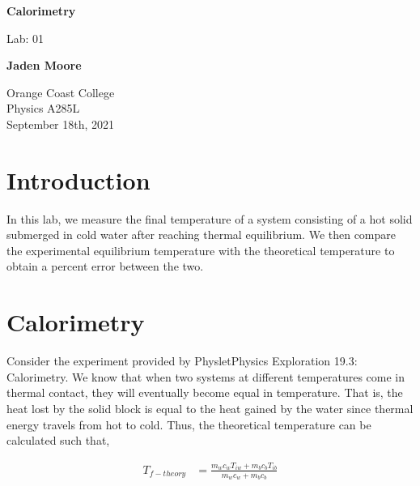 \documentclass[12pt]{article}
\begin{document}

\begin{titlepage}
    \begin{center}
        \vspace*{1cm}
        \textbf{Calorimetry}

        \vspace{0.5cm}
        Lab: 01

        \vspace{1cm}

        \textbf{Jaden Moore}

        \vfill

        Orange Coast College\\
        Physics A285L\\
        September 18th, 2021

    \end{center}
\end{titlepage}

\pagestyle{fancy}
\fancyhf{}
\setlength{\headheight}{15pt}
\cfoot{\thepage}

\section{Introduction}
In this lab, we measure the final temperature of a system consisting of a hot solid submerged in cold water after reaching thermal equilibrium. We then compare the experimental equilibrium temperature with the theoretical temperature to obtain a percent error between the two.

\section{Calorimetry}
Consider the experiment provided by Physlet\textregistered \space Physics Exploration 19.3: Calorimetry. We know that when two systems at different temperatures come in thermal contact, they will eventually become equal in temperature. That is, the heat lost by the solid block is equal to the heat gained by the water since thermal energy travels from hot to cold. Thus, the theoretical temperature can be calculated such that,

\begin{equation}
    \begin{split}
        T_{f-theory} &= \frac{m_wc_wT_{iw} + m_bc_bT_{ib}}{m_wc_w+m_bc_b}
    \end{split}
\end{equation}
\end{document}
